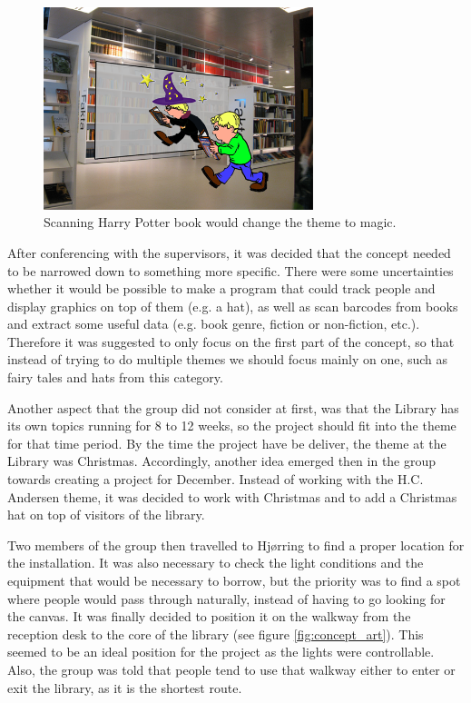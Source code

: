 \begin{figure}[htbp]
\centering
\includegraphics[width=0.7\textwidth]{Pictures/HjoerringLibrary/magician.png}
\caption{Scanning Harry Potter book would change the theme to magic.}
\label{fig:bookTheme}
\end{figure}

After conferencing with the supervisors, it was decided that the concept needed to be narrowed down to something more specific. There were some uncertainties whether it would be possible to make a program that could track people and display graphics on top of them (e.g. a hat), as well as scan barcodes from books and extract some useful data (e.g. book genre, fiction or non-fiction, etc.). Therefore it was suggested to only focus on the first part of the concept, so that instead of trying to do multiple themes we should focus mainly on one, such as fairy tales and hats from this category.

Another aspect that the group did not consider at first, was that the Library has its own topics running for 8 to 12 weeks, so the project should fit into the theme for that time period. By the time the project have be deliver, the theme at the Library was Christmas. Accordingly, another idea emerged then in the group towards creating a project for December. Instead of working with the H.C. Andersen theme, it was decided to work with Christmas and to add a Christmas hat on top of visitors of the library.

Two members of the group then travelled to Hj{\o}rring to find a proper location for the installation. It was also necessary to check the light conditions and the equipment that would be necessary to borrow, but the priority was to find a spot where people would pass through naturally, instead of having to go looking for the canvas. It was finally decided to position it on the walkway from the reception desk to the core of the library (see figure \ref{fig:concept_art}). This seemed to be an ideal position for the project as the lights were controllable. Also, the group was told that people tend to use that walkway either to enter or exit the library, as it is the shortest route. 

